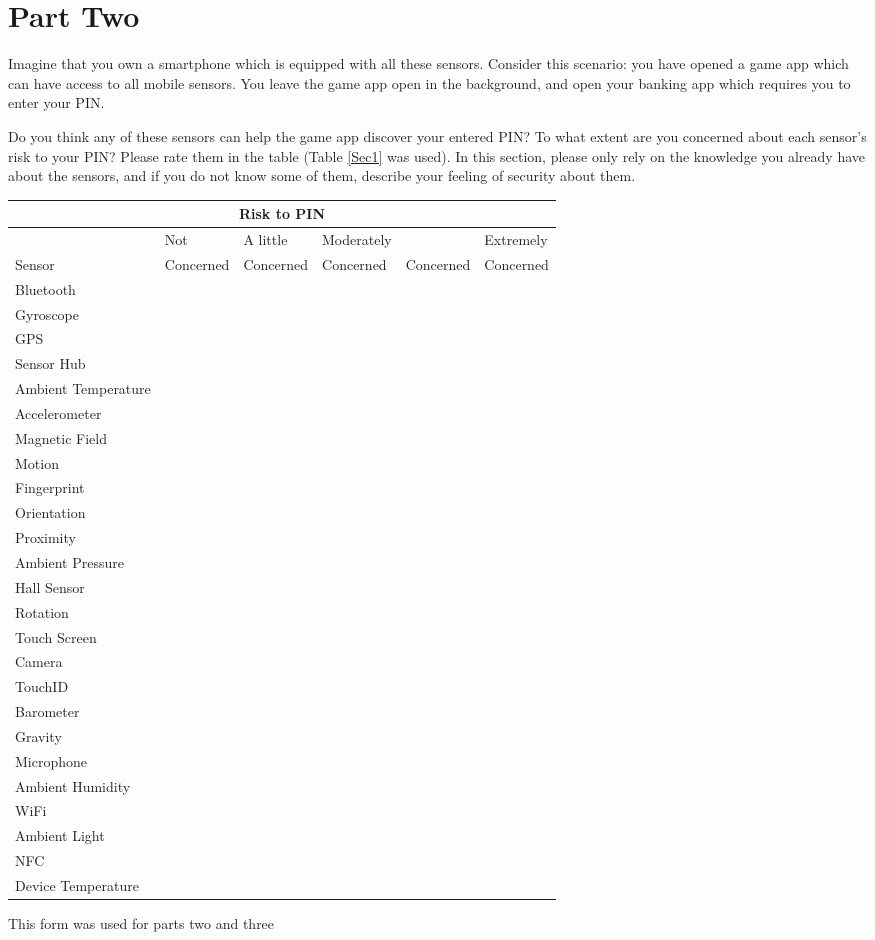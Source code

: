 \documentclass[10pt,twocolumn]{article}
\begin{document}
\section*{Part Two}
Imagine that you own a smartphone which is equipped with all these sensors. Consider this scenario: you have opened a game app which can have access to all mobile sensors. 
You leave the game app open in the background, and open your banking app which requires you to enter your PIN. 

Do you think any of these sensors can help the game app discover your entered PIN? 
To what extent are you concerned about each sensor's risk to your PIN? 
Please rate them in the table (Table \ref{Sec1} was used). 
In this section, please only rely on the knowledge you already have about the sensors, and if you do not know some of them, describe your feeling of security about them.  
\begin {table*}[t]
\begin{center}
\begin{tabular}{ |l||l|l|l|l|l|} 
 \hline 
 \multicolumn{6}{c}{Risk to PIN}\\ \hline
 &Not & A little &Moderately &&Extremely\\
  Sensor&Concerned &Concerned&Concerned&Concerned&Concerned\\\hline


Bluetooth&&&&&\\ \hline
Gyroscope&&&&&\\ \hline
GPS&&&&&\\ \hline
Sensor Hub&&&&&\\ \hline
Ambient Temperature&&&&&\\ \hline
Accelerometer&&&&&\\ \hline
Magnetic Field&&&&&\\ \hline
Motion&&&&&\\ \hline
Fingerprint&&&&&\\ \hline
Orientation&&&&&\\ \hline
Proximity &&&&&\\ \hline
Ambient Pressure&&&&&\\ \hline
Hall Sensor&&&&&\\ \hline
Rotation&&&&&\\ \hline
Touch Screen&&&&&\\ \hline
Camera&&&&&\\  \hline
TouchID &&&&&\\ \hline
Barometer&&&&&\\ \hline
Gravity&&&&&\\ \hline
Microphone&&&&&\\ \hline
Ambient Humidity&&&&&\\ \hline
WiFi&&&&&\\ \hline
Ambient Light&&&&&\\ \hline
NFC&&&&&\\ \hline
Device Temperature&&&&&\\\hline          
\end{tabular} 
\caption{This form was used for parts two and three}
\label{Sec1}
\end{center}
\end {table*}
\end{document}
